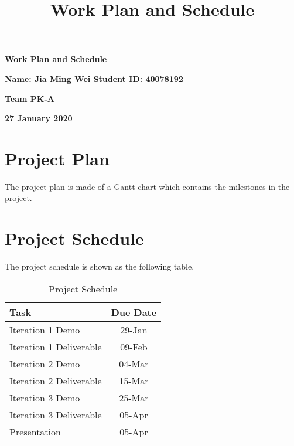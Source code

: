 \documentclass[tikz]{standalone}
\title{Work Plan and Schedule}
\begin{document}
\vspace*{0.2in}
\centerline{\bf\Large Work Plan and Schedule}

\vspace*{0.2in}
\centerline{\bf\Large Name: Jia Ming Wei   Student ID: 40078192}

\vspace*{0.2in}
\centerline{\bf\Large Team PK-A}

\vspace*{0.2in}
\centerline{\bf\Large 27 January 2020}


\section{Project Plan}
The project plan is made of a Gantt chart which contains the milestones in the project.

\section{Project Schedule}
The project schedule is shown as the following table.

\begin{table}[h!]
\centering
 \begin{tabular}{||l |c ||} 
 \hline
  Task & Due Date\\ [0.5ex] 
 \hline\hline
 Iteration 1 Demo & 29-Jan  \\ 
 Iteration 1 Deliverable &  09-Feb \\
 Iteration 2 Demo & 04-Mar  \\ 
 Iteration 2 Deliverable &  15-Mar \\
 Iteration 3 Demo & 25-Mar  \\ 
 Iteration 3 Deliverable &  05-Apr \\
 Presentation &  05-Apr\\[1ex] 

 \hline
 \end{tabular}
\caption{Project Schedule }
\label{table:1}
\end{table}
\end{document}
